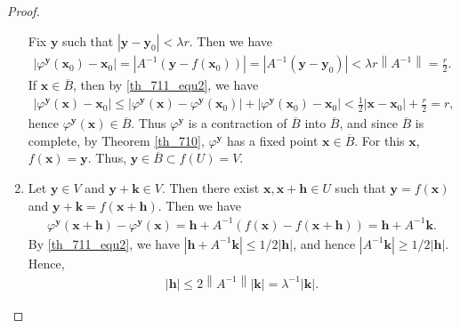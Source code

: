 \documentclass[10pt]{book}
\theoremstyle{definition}
\numberwithin{equation}{chapter}
\begin{document}
\begin{proof}
\begin{enumerate}[label=(\alph*)]
    Fix $\mathbf{y}$ such that $\left|\mathbf{y} - \mathbf{y}_0\right| < \lambda r$. Then we have
    \begin{align*}
        \left|\varphi^{\mathbf{y}}(\mathbf{x}_0) - \mathbf{x}_0\right| = \left|A^{-1}\left(\mathbf{y} - f(\mathbf{x}_0)\right)\right| = \left|A^{-1}\left(\mathbf{y} - \mathbf{y}_0\right)\right| < \lambda r \left\|A^{-1}\right\| = \frac{r}{2}.
    \end{align*}
    If $\mathbf{x} \in \overline{B}$, then by \eqref{th_711_equ2}, we have
    \begin{align*}
        \left|\varphi^{\mathbf{y}}(\mathbf{x}) - \mathbf{x}_0\right| \leq \left|\varphi^{\mathbf{y}}(\mathbf{x}) - \varphi^{\mathbf{y}}(\mathbf{x}_0)\right| + \left|\varphi^{\mathbf{y}}(\mathbf{x}_0) - \mathbf{x}_0\right| < \frac{1}{2} \left|\mathbf{x} - \mathbf{x}_0\right| + \frac{r}{2} = r,
    \end{align*}
    hence $\varphi^{\mathbf{y}}(\mathbf{x}) \in \overline{B}$. Thus $\varphi^{\mathbf{y}}$ is a contraction of $\overline{B}$ into $\overline{B}$, and since $\overline{B}$ is complete, by Theorem \ref{th_710}, $\varphi^{\mathbf{y}}$ has a fixed point $\mathbf{x} \in \overline{B}$. For this $\mathbf{x}$, $f(\mathbf{x}) = \mathbf{y}$. Thus, $\mathbf{y} \in \overline{B} \subset f(U) = V$. 
    
    \item Let $\mathbf{y} \in V$ and $\mathbf{y} + \mathbf{k} \in V$. Then there exist $\mathbf{x}, \mathbf{x} + \mathbf{h} \in U$ such that $\mathbf{y} = f(\mathbf{x})$ and $\mathbf{y} + \mathbf{k} = f(\mathbf{x} + \mathbf{h})$. Then we have
    \begin{align*}
        \varphi^{\mathbf{y}}(\mathbf{x} + \mathbf{h}) - \varphi^{\mathbf{y}}(\mathbf{x}) = \mathbf{h} + A^{-1} \left(f(\mathbf{x}) - f(\mathbf{x} + \mathbf{h})\right) = \mathbf{h} + A^{-1} \mathbf{k}.
    \end{align*}
    By \eqref{th_711_equ2}, we have $\left|\mathbf{h} + A^{-1} \mathbf{k}\right| \leq 1/2 \left|\mathbf{h}\right|$, and hence $\left|A^{-1} \mathbf{k}\right| \geq 1/2 \left|\mathbf{h}\right|$. Hence, 
    \begin{align}\label{th_711_equ3}
        \left|\mathbf{h}\right| \leq 2 \left\|A^{-1}\right\| \left|\mathbf{k}\right| = \lambda^{-1} \left|\mathbf{k}\right|.
    \end{align}
    

\end{enumerate}
\end{proof}
\end{document}
